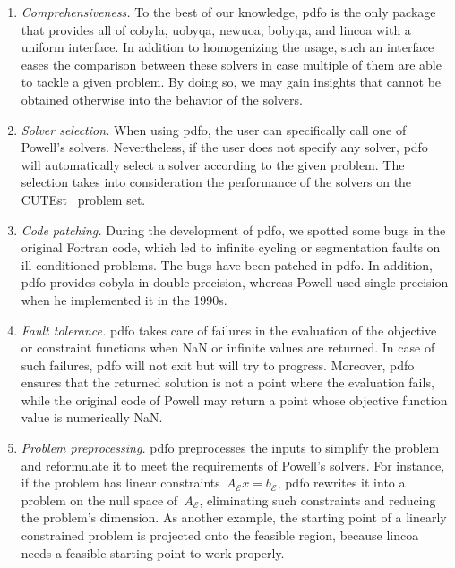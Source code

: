 \documentclass[
    smallextended,  %
    draft,          %
]{svjour3}
\newcommand{\aeq}{A_{\scriptscriptstyle\mathcal{E}}}
\newcommand{\beq}{b_{\scriptscriptstyle\mathcal{E}}}
\begin{document}
\begin{enumerate}
    \item \emph{Comprehensiveness.}
    To the best of our knowledge, \gls{pdfo} is the only package that provides all of \gls{cobyla}, \gls{uobyqa}, \gls{newuoa}, \gls{bobyqa}, and \gls{lincoa} with a uniform interface.
    In addition to homogenizing the usage, such an interface eases the comparison between these solvers in case multiple of them are able to tackle a given problem.
    By doing so, we may gain insights that cannot be obtained otherwise into the behavior of the solvers.

    \item \emph{Solver selection.}
    When using \gls{pdfo}, the user can specifically call one of Powell's solvers. Nevertheless, if the user does not specify any solver, \gls{pdfo} will automatically select a solver according to the given problem.
    The selection takes into consideration the performance of the solvers on the CUTEst~\cite{Gould_Orban_Toint_2015} problem set.

    \item \emph{Code patching.}
    During the development of \gls{pdfo}, we spotted some bugs in the original Fortran code, which led to infinite cycling or segmentation faults on ill-conditioned problems.
    The bugs have been patched in \gls{pdfo}.
    In addition, \gls{pdfo} provides \gls{cobyla} in double precision, whereas Powell used single precision when he implemented it in the 1990s.

    \item \emph{Fault tolerance.}
    \Gls{pdfo} takes care of failures in the evaluation of the objective or constraint functions when NaN or infinite values are returned.
    In case of such failures, \gls{pdfo} will not exit but will try to progress.
    Moreover, \gls{pdfo} ensures that the returned solution is not a point where the evaluation fails, while the original code of Powell may return a point whose objective function value is numerically NaN.

    \item \emph{Problem preprocessing.}
    \Gls{pdfo} preprocesses the inputs to simplify the problem and reformulate it to meet the requirements of Powell's solvers.
    For instance, if the problem has linear constraints~$\aeq x = \beq$, \gls{pdfo} rewrites it into a problem on the null space of~$\aeq$, eliminating such constraints and reducing the problem's dimension.
    As another example, the starting point of a linearly constrained problem is projected onto the feasible region, because \gls{lincoa} needs a feasible starting point to work properly.


\end{enumerate}
\end{document}
